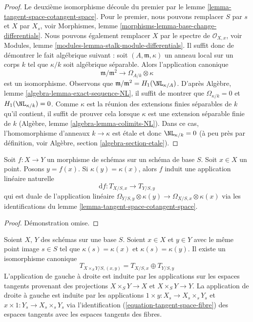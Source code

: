 \begin{proof}
Le deuxième isomorphisme découle du premier par le lemme
\ref{lemma-tangent-space-cotangent-space}. Pour le premier, nous
pouvons remplacer $S$ par $s$ et $X$ par $X_s$, voir Morphismes,
lemme \ref{morphisms-lemma-base-change-differentials}. Nous
pouvons également remplacer $X$ par le spectre de $\mathcal{O}_{X,
x}$, voir Modules, lemme
\ref{modules-lemma-stalk-module-differentials}. Il suffit donc de démontrer le fait
algébrique suivant : soit $(A, \mathfrak m, \kappa)$ un anneau local sur un corps
$k$ tel que $\kappa/k$ soit algébrique séparable. Alors l'application canonique
$$
\mathfrak m/\mathfrak m^2
\longrightarrow
\Omega_{A/k} \otimes \kappa
$$
est un isomorphisme. Observons que $\mathfrak
m/\mathfrak m^2 = H_1(\NL_{\kappa/A})$. D'après
Algèbre, lemme \ref{algebra-lemma-exact-sequence-NL},
il suffit de montrer que $\Omega_{\kappa/k} = 0$ et
$H_1(\NL_{\kappa/k}) = 0$. Comme $\kappa$ est la réunion des
extensions finies séparables de $k$ qu'il contient, il suffit de
prouver cela lorsque $\kappa$ est une extension séparable
finie de $k$ (Algèbre, lemme
\ref{algebra-lemma-colimits-NL}). Dans ce cas, l'homomorphisme
d'anneaux $k \to \kappa$ est étale et donc $\NL_{\kappa/k} = 0$ (à peu
près par définition, voir Algèbre, section \ref{algebra-section-etale}).
\end{proof}

\begin{lemma}
\label{lemma-map-tangent-spaces}
Soit $f : X \to Y$ un morphisme de schémas sur un schéma de
base $S$. Soit $x \in X$ un point. Posons $y = f(x)$. Si
$\kappa(y) = \kappa(x)$, alors $f$ induit une application linéaire naturelle
$$
\text{d}f : T_{X/S, x} \longrightarrow T_{Y/S, y}
$$
qui est duale de l'application linéaire $\Omega_{Y/S, y} \otimes
\kappa(y) \to \Omega_{X/S, x} \otimes \kappa(x)$ via les
identifications du lemme \ref{lemma-tangent-space-cotangent-space}.
\end{lemma}

\begin{proof}
Démonstration omise.
\end{proof}

\begin{lemma}
\label{lemma-tangent-space-product}
Soient $X$, $Y$ des schémas sur une base $S$. Soient $x \in
X$ et $y \in Y$ avec le même point image $s \in S$ tel que $\kappa(s) =
\kappa(x)$ et $\kappa(s) = \kappa(y)$. Il existe un isomorphisme canonique
$$
T_{X \times_S Y/S, (x, y)} = T_{X/S, x} \oplus T_{Y/S, y}
$$
L'application de gauche à droite est induite par les
applications sur les espaces tangents provenant des
projections $X \times_S Y \to X$ et $X \times_S Y \to Y$. La
application de droite à gauche est induite par les applications $1
\times y : X_s \to X_s \times_s Y_s$ et $x \times 1 : Y_s \to X_s
\times_s Y_s$ via l'identification
(\ref{equation-tangent-space-fibre}) des espaces tangents avec les espaces tangents des fibres.
\end{lemma}

